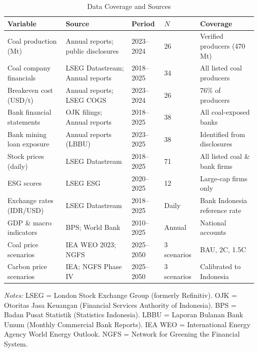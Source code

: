 \begin{table}[htbp]
\centering
\caption{Data Coverage and Sources}
\label{tab:data_sources}
\footnotesize
\begin{tabular}{p{3.5cm}p{3.5cm}p{1.8cm}p{1.5cm}p{3.2cm}}
\toprule
Variable & Source & Period & $N$ & Coverage \\
\midrule
  Coal production (Mt) & Annual reports; public disclosures & 2023--2024 & 26 & Verified producers (470 Mt) \\
  Coal company financials & LSEG Datastream; Annual reports & 2018--2025 & 34 & All listed coal producers \\
  Breakeven cost (USD/t) & Annual reports; LSEG COGS & 2023--2024 & 26 & 76\% of producers \\
  Bank financial statements & OJK filings; Annual reports & 2018--2025 & 38 & All coal-exposed banks \\
  Bank mining loan exposure & Annual reports (LBBU) & 2023--2025 & 38 & Identified from disclosures \\
  Stock prices (daily) & LSEG Datastream & 2018--2025 & 71 & All listed coal \& bank firms \\
  ESG scores & LSEG ESG & 2020--2025 & 12 & Large-cap firms only \\
  Exchange rates (IDR/USD) & LSEG Datastream & 2018--2025 & Daily & Bank Indonesia reference rate \\
  GDP \& macro indicators & BPS; World Bank & 2010--2025 & Annual & National accounts \\
  Coal price scenarios & IEA WEO 2023; NGFS & 2025--2050 & 3 scenarios & BAU, 2\textdegree{}C, 1.5\textdegree{}C \\
  Carbon price scenarios & IEA; NGFS Phase IV & 2025--2050 & 3 scenarios & Calibrated to Indonesia \\
\bottomrule
\end{tabular}

\smallskip
\noindent \textit{Notes:} LSEG = London Stock Exchange Group (formerly Refinitiv). OJK = Otoritas Jasa Keuangan (Financial Services Authority of Indonesia). BPS = Badan Pusat Statistik (Statistics Indonesia). LBBU = Laporan Bulanan Bank Umum (Monthly Commercial Bank Reports). IEA WEO = International Energy Agency World Energy Outlook. NGFS = Network for Greening the Financial System.
\end{table}
